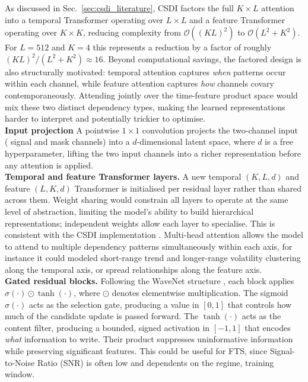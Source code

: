 As discussed in Sec.~\ref{sec:csdi_literature}, CSDI factors the full 
\(K \times L\) attention into a temporal Transformer operating over 
\(L \times L\) and a feature Transformer operating over \(K \times K\), 
reducing complexity from \(\mathcal{O}\!\left((KL)^2\right)\) to 
\(\mathcal{O}(L^2 + K^2)\). For \(L = 512\) and \(K = 4\) this 
represents a reduction by a factor of roughly \((KL)^2 / (L^2 + K^2) 
\approx 16\). Beyond computational savings, the factored design is also 
structurally motivated: temporal attention captures \emph{when} patterns 
occur within each channel, while feature attention captures \emph{how} 
channels covary contemporaneously. Attending jointly over the time-feature 
product space would mix these two distinct dependency 
types, making the learned representations harder to interpret and 
potentially trickier to optimise.\\

\textbf{Input projection} A pointwise \(1 \times 1\) convolution projects the two-channel input ( signal and mask channels) into a \(d\)-dimensional 
latent space, where \(d\) is a free hyperparameter, lifting the two input channels into a richer representation before any attention is applied.\\

\textbf{Temporal and feature Transformer layers.} A new temporal 
\((K, L, d)\) and feature \((L, K, d)\) Transformer is initialised per 
residual layer rather than shared across them. Weight sharing would 
constrain all layers to operate at the same level of abstraction, 
limiting the model's ability to build hierarchical representations; 
independent weights allow each layer to specialise. This is consistent 
with the CSDI implementation \cite{tashiro2021csdi}. Multi-head attention 
\cite{vaswani2017attention} allows the model to attend to multiple 
dependency patterns simultaneously within each axis, for instance it could modeled 
short-range trend and longer-range volatility clustering along the temporal axis, or spread relationships along the feature axis.\\

\textbf{Gated residual blocks.} Following the WaveNet structure 
\cite{oord2016wavenet}, each block applies \(\sigma(\cdot) \odot 
\tanh(\cdot)\), where \(\odot\) denotes elementwise multiplication. The 
sigmoid \(\sigma(\cdot)\) acts as the selection gate, producing a value 
in \([0,1]\) that controls how much of the candidate update is passed 
forward. The \(\tanh(\cdot)\) acts as the content filter, producing a 
bounded, signed activation in \([-1,1]\) that encodes \emph{what} 
information to write. Their product suppresses uninformative information 
while preserving significant features. This could be useful for FTS, since Signal-to-Noise Ratio (SNR) is often low and dependents on the regime, training window.\\

